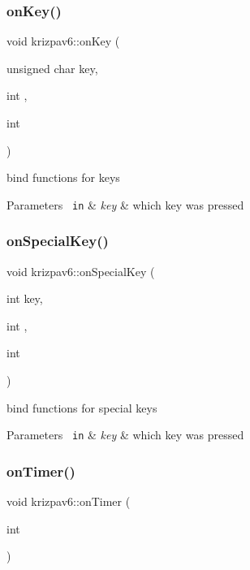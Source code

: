 \subsubsection{\texorpdfstring{onKey()}{onKey()}}
{\footnotesize\ttfamily void krizpav6\+::on\+Key (\begin{DoxyParamCaption}\item[{unsigned char}]{key,  }\item[{int}]{,  }\item[{int}]{ }\end{DoxyParamCaption})}

bind functions for keys 
\begin{DoxyParams}[1]{Parameters}
\mbox{\texttt{ in}}  & {\em key} & which key was pressed \\
\hline
\end{DoxyParams}
\mbox{\label{namespacekrizpav6_af94b0984a9318836f32a2438a711e8af}} 
\subsubsection{\texorpdfstring{onSpecialKey()}{onSpecialKey()}}
{\footnotesize\ttfamily void krizpav6\+::on\+Special\+Key (\begin{DoxyParamCaption}\item[{int}]{key,  }\item[{int}]{,  }\item[{int}]{ }\end{DoxyParamCaption})}

bind functions for special keys 
\begin{DoxyParams}[1]{Parameters}
\mbox{\texttt{ in}}  & {\em key} & which key was pressed \\
\hline
\end{DoxyParams}
\mbox{\label{namespacekrizpav6_a23bdf5027af84f3f40742a64f74744bb}} 
\subsubsection{\texorpdfstring{onTimer()}{onTimer()}}
{\footnotesize\ttfamily void krizpav6\+::on\+Timer (\begin{DoxyParamCaption}\item[{int}]{ }\end{DoxyParamCaption})}

